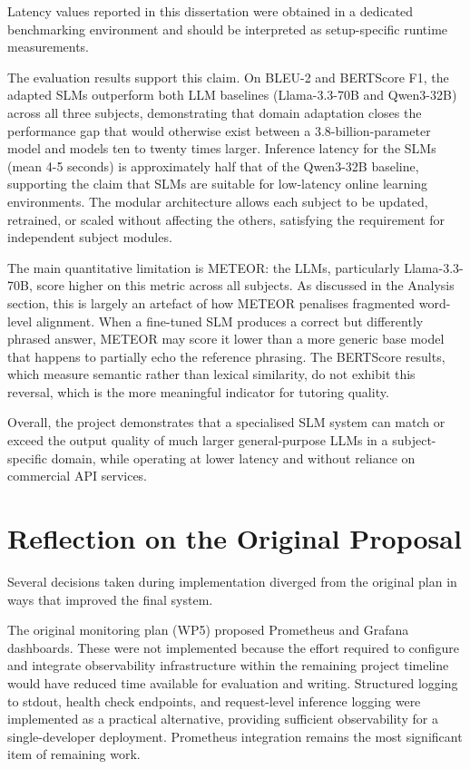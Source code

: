 Latency values reported in this dissertation were obtained in a dedicated benchmarking environment and should be interpreted as setup-specific runtime measurements.

The evaluation results support this claim. On BLEU-2 and BERTScore F1, the adapted SLMs outperform both LLM baselines (Llama-3.3-70B and Qwen3-32B) across all three subjects, demonstrating that domain adaptation closes the performance gap that would otherwise exist between a 3.8-billion-parameter model and models ten to twenty times larger. Inference latency for the SLMs (mean 4-5 seconds) is approximately half that of the Qwen3-32B baseline, supporting the claim that SLMs are suitable for low-latency online learning environments. The modular architecture allows each subject to be updated, retrained, or scaled without affecting the others, satisfying the requirement for independent subject modules.

The main quantitative limitation is METEOR: the LLMs, particularly Llama-3.3-70B, score higher on this metric across all subjects. As discussed in the Analysis section, this is largely an artefact of how METEOR penalises fragmented word-level alignment. When a fine-tuned SLM produces a correct but differently phrased answer, METEOR may score it lower than a more generic base model that happens to partially echo the reference phrasing. The BERTScore results, which measure semantic rather than lexical similarity, do not exhibit this reversal, which is the more meaningful indicator for tutoring quality.

Overall, the project demonstrates that a specialised SLM system can match or exceed the output quality of much larger general-purpose LLMs in a subject-specific domain, while operating at lower latency and without reliance on commercial API services.

\section{Reflection on the Original Proposal}

Several decisions taken during implementation diverged from the original plan in ways that improved the final system.

The original monitoring plan (WP5) proposed Prometheus and Grafana dashboards. These were not implemented because the effort required to configure and integrate observability infrastructure within the remaining project timeline would have reduced time available for evaluation and writing. Structured logging to stdout, health check endpoints, and request-level inference logging were implemented as a practical alternative, providing sufficient observability for a single-developer deployment. Prometheus integration remains the most significant item of remaining work.


